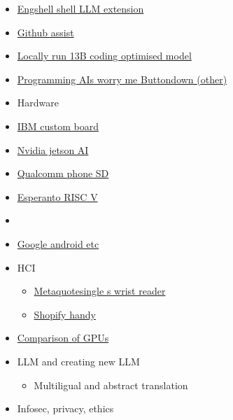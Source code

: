 \begin{itemize}
\item
  \href{https://github.com/emcf/engshell/tree/main}{Engshell shell LLM
  extension}
\item
  \href{https://useadrenaline.com/app}{Github assist}
\item
  \href{https://huggingface.co/ehartford/alpaca1337-13b-4bit/tree/main}{Locally
  run 13B coding optimised model}
\item
  \href{https://buttondown.email/hillelwayne/archive/programming-ais-worry-me/}{Programming
  AIs worry me   Buttondown (other)}
\item
  Hardware
\item
  \href{https://www.marktechpost.com/2022/10/27/ibm-research-introduces-artificial-intelligence-unit-aiu-its-first-complete-system-on-chip-designed-to-run-and-train-deep-learning-models-faster-and-more-efficiently-than-a-general-purpose-cpu/}{IBM
  custom board}
\item
  \href{https://www.okdo.com/p/nvidia-jetson-agx-orin-64gb-developer-kit/}{Nvidia
  jetson AI}
\item
  \href{https://www.theverge.com/2023/2/23/23611668/ai-image-stable-diffusion-mobile-android-qualcomm-fastest}{Qualcomm
  phone SD}
\item
  \href{https://www.esperanto.ai/}{Esperanto RISC V}
\item
  \href{https://hdh4797.wixsite.com/dhan/project-1}{}
\item
  \href{https://developers.google.com/learn/topics/on-device-ml}{Google
  android etc}
\item
  HCI

  \begin{itemize}
   
  \item
    \href{https://www.from-the-interface.com/wrist-interfaces/}{Metaquotesingle s
    wrist reader}
  \item
    \href{https://github.com/Shopify/handy}{Shopify handy}
  \end{itemize}
\item
  \href{https://timdettmers.com/2023/01/16/which-gpu-for-deep-learning/}{Comparison
  of GPUs}
\item
  LLM and creating new LLM

  \begin{itemize}
   
  \item
    Multiligual and abstract translation
  \end{itemize}
\item
  Infosec, privacy, ethics


\end{itemize}
